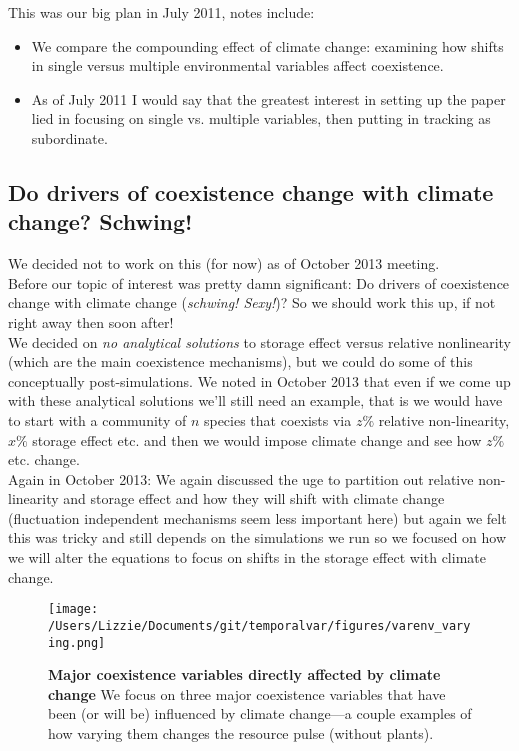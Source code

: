 \documentclass[11pt,a4paper,oneside]{article}
\begin{document}
This was our big plan in July 2011, notes include:\\
\begin{itemize}
\item We compare the compounding effect of climate change: examining
  how shifts in single versus multiple environmental variables affect
  coexistence.
\item As of July 2011 I would say that the greatest interest in setting up
the paper lied in focusing on single vs. multiple variables, then
putting in tracking as subordinate. 
\end{itemize}

\subsection{Do drivers of coexistence change with climate change? Schwing!}
\noindent We decided not to work on this (for now) as of October 2013 meeting.\\

 Before our topic of interest was pretty damn significant: Do drivers of coexistence change with climate change (\emph{schwing! Sexy!})? So we should work this up, if not right away then soon after!\\

We decided on \emph{no analytical solutions} to storage effect versus relative nonlinearity (which are the main coexistence mechanisms), but we could do some of this conceptually post-simulations. We noted in October 2013 that even if we come up with these analytical solutions we'll still need an example, that is we would have to start with a community of \(n\) species that coexists via \(z\%\) relative non-linearity, \(x\%\) storage effect etc. and then we would impose climate change and see how \(z\%\) etc. change.\\

Again in October 2013: We again discussed the uge to partition out relative non-linearity and storage effect and how they will shift with climate change (fluctuation independent mechanisms seem less important here) but again we felt this was tricky and still depends on the simulations we run so we focused on how we will alter the equations to focus on shifts in the storage effect with climate change.


\newpage
\begin{figure}[h!]
\centering
\noindent \texttt{[image: /Users/Lizzie/Documents/git/temporalvar/figures/varenv\_varying.png]}
\caption{{\bf Major coexistence variables directly affected by
    climate change}  We focus on three major coexistence variables
  that have been (or will be) influenced by climate change---a couple
  examples of how varying them changes the resource pulse (without plants).}
\end{figure}
\end{document}

